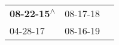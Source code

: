 \begin{supertabular}{lll}
 \textbf{08-22-15\textsuperscript{$\wedge$}} &  08-17-18\textsuperscript{} \\
                  04-28-17\textsuperscript{} &  08-16-19\textsuperscript{} \\
\end{supertabular}
